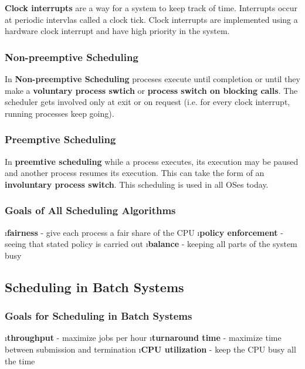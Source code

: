 \documentclass{article}
\begin{document}
    \textbf{Clock interrupts} are a way for a system to keep track of time. Interrupts occur at periodic intervlas called a clock tick. Clock interrupts are implemented using a hardware clock interrupt and have high priority in the system. 

    \subsubsection{Non-preemptive Scheduling}
    
    In \textbf{Non-preemptive Scheduling} proceses execute until completion or until they make a \textbf{voluntary process swtich} or \textbf{process switch on blocking calls}. The scheduler gets involved only at exit or on request (i.e. for every clock interrupt, running processes keep going).

    \subsubsection{Preemptive Scheduling}

    In \textbf{preemtive scheduling} while a process executes, its execution may be paused and another process resumes its execution. This can take the form of an \textbf{involuntary process switch}. This scheduling is used in all OSes today. 

    \subsubsection{Goals of All Scheduling Algorithms}

    \bl
    \i \textbf{fairness} - give each process a fair share of the CPU
    \i \textbf{policy enforcement} - seeing that stated policy is carried out
    \i \textbf{balance} - keeping all parts of the system busy
    \el
        
\subsection{Scheduling in Batch Systems}

    \subsubsection{Goals for Scheduling in Batch Systems}
    \bl
    \i \textbf{throughput} - maximize jobs per hour
    \i \textbf{turnaround time} - maximize time between submission and termination
    \i \textbf{CPU utilization} - keep the CPU busy all the time
    \el
\end{document}
